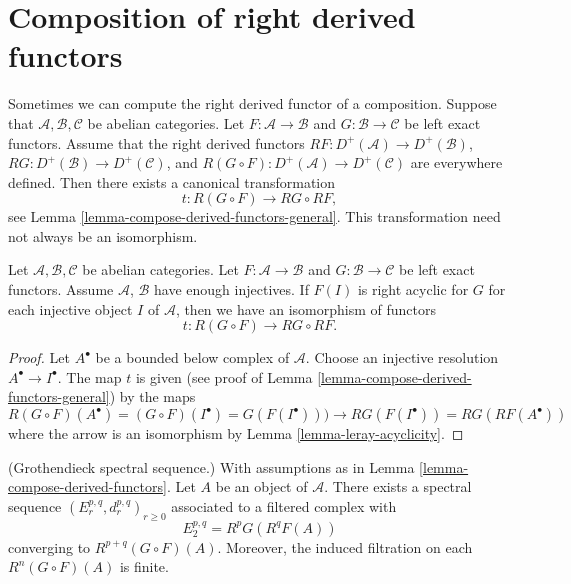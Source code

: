 \section{Composition of right derived functors}
\label{section-composition-right-derived-functors}

\noindent
Sometimes we can compute the right derived functor of a composition.
Suppose that $\mathcal{A}, \mathcal{B}, \mathcal{C}$ be abelian categories.
Let $F : \mathcal{A} \to \mathcal{B}$ and $G : \mathcal{B} \to \mathcal{C}$
be left exact functors. Assume that the right derived functors
$RF : D^{+}(\mathcal{A}) \to D^{+}(\mathcal{B})$,
$RG : D^{+}(\mathcal{B}) \to D^{+}(\mathcal{C})$, and
$R(G \circ F) : D^{+}(\mathcal{A}) \to D^{+}(\mathcal{C})$
are everywhere defined. Then there exists a canonical transformation
$$
t : R(G \circ F) \longrightarrow RG \circ RF,
$$
see
Lemma \ref{lemma-compose-derived-functors-general}.
This transformation need not always be an isomorphism.

\begin{lemma}
\label{lemma-compose-derived-functors}
Let $\mathcal{A}, \mathcal{B}, \mathcal{C}$ be abelian categories.
Let $F : \mathcal{A} \to \mathcal{B}$
and $G : \mathcal{B} \to \mathcal{C}$ be left exact functors.
Assume $\mathcal{A}$, $\mathcal{B}$ have enough injectives.
If $F(I)$ is right acyclic for $G$ for each injective object $I$
of $\mathcal{A}$, then we have an isomorphism of functors
$$
t : R(G \circ F) \longrightarrow RG \circ RF.
$$
\end{lemma}

\begin{proof}
Let $A^\bullet$ be a bounded below complex of $\mathcal{A}$.
Choose an injective resolution $A^\bullet \to I^\bullet$.
The map $t$ is given (see proof of
Lemma \ref{lemma-compose-derived-functors-general})
by the maps
$$
R(G \circ F)(A^\bullet) =
(G \circ F)(I^\bullet) =
G(F(I^\bullet))) \to
RG(F(I^\bullet)) =
RG(RF(A^\bullet))
$$
where the arrow is an isomorphism by
Lemma \ref{lemma-leray-acyclicity}.
\end{proof}

\begin{lemma}
\label{lemma-grothendieck-spectral-sequence}
(Grothendieck spectral sequence.)
With assumptions as in Lemma \ref{lemma-compose-derived-functors}.
Let $A$ be an object of $\mathcal{A}$.
There exists a spectral sequence $(E_r^{p, q}, d_r^{p, q})_{r \geq 0}$
associated to a filtered complex with
$$
E_2^{p, q} = R^pG(R^qF(A))
$$
converging to $R^{p + q}(G \circ F)(A)$. Moreover, the induced filtration
on each $R^n(G \circ F)(A)$ is finite.
\end{lemma}

